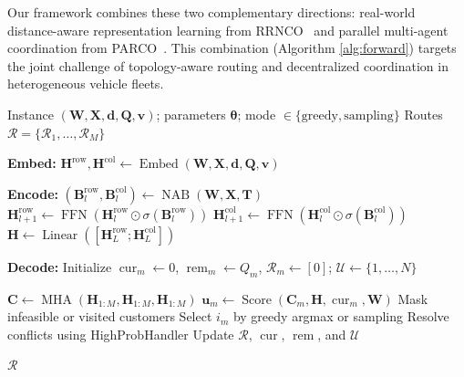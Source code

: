 \documentclass[journal,twoside,web]{ieeecolor}
\theoremstyle{definition}
\theoremstyle{remark}
\theoremstyle{definition}
\begin{document}
Our framework combines these two complementary directions: real-world distance-aware representation learning from RRNCO~\cite{rrnco2025} and parallel multi-agent coordination from PARCO~\cite{parco2024}. This combination (Algorithm \ref{alg:forward}) targets the joint challenge of topology-aware routing and decentralized coordination in heterogeneous vehicle fleets.

\begin{algorithm}[htbp]
\caption{Hybrid NCO Forward Pass}
\label{alg:forward}
\begin{algorithmic}[1]
\Require Instance $(\mathbf{W},\mathbf{X},\mathbf{d},\mathbf{Q},\mathbf{v})$;
parameters $\boldsymbol{\theta}$; mode $\in\{\text{greedy},\text{sampling}\}$
\Ensure Routes $\mathcal{R}=\{\mathcal{R}_1,\ldots,\mathcal{R}_M\}$

\State \textbf{Embed:}
\State $\mathbf{H}^{\mathrm{row}},\mathbf{H}^{\mathrm{col}}
\gets \operatorname{Embed}(\mathbf{W},\mathbf{X},\mathbf{d},\mathbf{Q},\mathbf{v})$

\State \textbf{Encode:}
    \State $(\mathbf{B}^{\mathrm{row}}_l,\mathbf{B}^{\mathrm{col}}_l)
    \gets \operatorname{NAB}(\mathbf{W},\mathbf{X},\mathbf{T})$
    \State $\mathbf{H}^{\mathrm{row}}_{l+1}
    \gets \operatorname{FFN}\!\left(
    \mathbf{H}^{\mathrm{row}}_l\odot\sigma(\mathbf{B}^{\mathrm{row}}_l)\right)$
    \State $\mathbf{H}^{\mathrm{col}}_{l+1}
    \gets \operatorname{FFN}\!\left(
    \mathbf{H}^{\mathrm{col}}_l\odot\sigma(\mathbf{B}^{\mathrm{col}}_l)\right)$
\EndFor
\State $\mathbf{H}\gets
\operatorname{Linear}([\mathbf{H}^{\mathrm{row}}_L;\mathbf{H}^{\mathrm{col}}_L])$

\State \textbf{Decode:}
\State Initialize $\operatorname{cur}_m\gets0$,
$\operatorname{rem}_m\gets Q_m$, $\mathcal{R}_m\gets[0]$;
$\mathcal{U}\gets\{1,\ldots,N\}$

    \State $\mathbf{C}\gets
    \operatorname{MHA}(\mathbf{H}_{1:M},
    \mathbf{H}_{1:M},\mathbf{H}_{1:M})$
        \State $\mathbf{u}_m\gets
        \operatorname{Score}(\mathbf{C}_m,\mathbf{H},
        \operatorname{cur}_m,\mathbf{W})$
        \State Mask infeasible or visited customers
        \State Select $i_m$ by greedy argmax or sampling
    \EndFor
    \State Resolve conflicts using HighProbHandler
    \State Update $\mathcal{R}$, $\operatorname{cur}$, $\operatorname{rem}$, and $\mathcal{U}$
\EndWhile

\State \Return $\mathcal{R}$
\end{algorithmic}
\end{algorithm}
\end{document}
